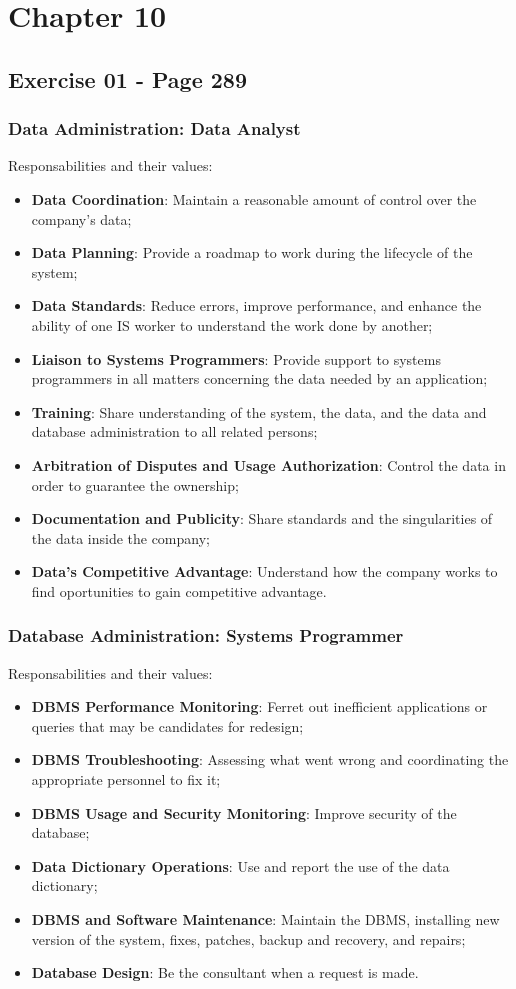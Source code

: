 \chapter{Chapter 10}
	\section{Exercise 01 - Page 289}
		\subsection{Data Administration: Data Analyst}
			Responsabilities and their values:
			\begin{itemize}
				\item{\textbf{Data Coordination}: Maintain a reasonable amount of control over the company's data;}
				\item{\textbf{Data Planning}: Provide a roadmap to work during the lifecycle of the system;}
				\item{\textbf{Data Standards}: Reduce errors, improve performance, and enhance the ability of one IS worker to understand the work done by another;}
				\item{\textbf{Liaison to Systems Programmers}: Provide support to systems programmers in all matters concerning the data needed by an application;}
				\item{\textbf{Training}: Share understanding of the system, the data, and the data and database administration to all related persons;}
				\item{\textbf{Arbitration of Disputes and Usage Authorization}: Control the data in order to guarantee the ownership;}
				\item{\textbf{Documentation and Publicity}: Share standards and the singularities of the data inside the company;}
				\item{\textbf{Data's Competitive Advantage}: Understand how the company works to find oportunities to gain competitive advantage.}
			\end{itemize}
		\subsection{Database Administration: Systems Programmer}
			Responsabilities and their values:
			\begin{itemize}
				\item{\textbf{DBMS Performance Monitoring}: Ferret out inefficient applications or queries that may be candidates for redesign;}
				\item{\textbf{DBMS Troubleshooting}: Assessing what went wrong and coordinating the appropriate personnel to fix it;}
				\item{\textbf{DBMS Usage and Security Monitoring}: Improve security of the database;}
				\item{\textbf{Data Dictionary Operations}: Use and report the use of the data dictionary;}
				\item{\textbf{DBMS and Software Maintenance}: Maintain the DBMS, installing new version of the system, fixes, patches, backup and recovery, and repairs;}
				\item{\textbf{Database Design}: Be the consultant when a request is made.}
			\end{itemize}
